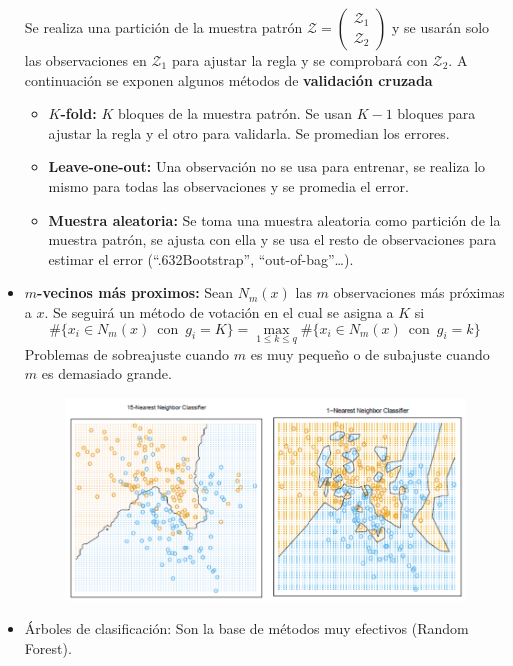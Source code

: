 \begin{itemize}
    Se realiza una partición de la muestra patrón $\mathcal{Z}=\begin{pmatrix}\mathcal{Z}_1 \\ \mathcal{Z}_2\end{pmatrix}$ y se usarán solo las observaciones en $\mathcal{Z}_1$ para ajustar la regla y se comprobará con $\mathcal{Z}_2$. A continuación se exponen algunos métodos de \textbf{validación cruzada}
    \begin{itemize}
        \item \textbf{$K$-fold:} $K$ bloques de la muestra patrón. Se usan $K-1$ bloques para ajustar la regla y el otro para validarla. Se promedian los errores.
        \item \textbf{Leave-one-out:} Una observación no se usa para entrenar, se realiza lo mismo para todas las observaciones y se promedia el error.
        \item \textbf{Muestra aleatoria:} Se toma una muestra aleatoria como partición de la muestra patrón, se ajusta con ella y se usa el resto de observaciones para estimar el error (``.632Bootstrap'', ``out-of-bag''\dots).
    \end{itemize}
    \item \textbf{$m$-vecinos más proximos:} Sean $N_m(x)$ las $m$ observaciones más próximas a $x$. Se seguirá un método de votación en el cual se asigna a $K$ si
    \[
        \#\{x_i\in N_m(x)\enspace \text{con} \enspace g_i=K\}=\max_{1\leq k\leq q}\#\{x_i\in N_m(x)\enspace \text{con} \enspace g_i=k\}
    \]
    \newpage
    Problemas de sobreajuste cuando $m$ es muy pequeño o de subajuste cuando $m$ es demasiado grande.
    \begin{figure}[h]
        \centering
        \includegraphics[width=\textwidth]{assets/k_neighbours.png}
    \end{figure}
    \item Árboles de clasificación: Son la base de métodos muy efectivos (Random Forest).

\end{itemize}
